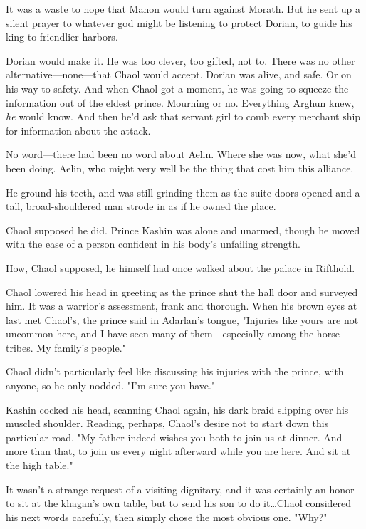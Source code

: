 It was a waste to hope that Manon would turn against Morath.
But he sent up a silent prayer to whatever god might be listening to protect Dorian, to guide his king to friendlier harbors.

Dorian would make it.
He was too clever, too gifted, not to.
There was no other alternative---none---that Chaol would accept.
Dorian was alive, and safe.
Or on his way to safety.
And when Chaol got a moment, he was going to squeeze the information out of the eldest prince.
Mourning or no.
Everything Arghun knew, \emph{he} would know.
And then he'd ask that servant girl to comb every merchant ship for information about the attack.

No word---there had been no word about Aelin.
Where she was now, what she'd been doing.
Aelin, who might very well be the thing that cost him this alliance.

He ground his teeth, and was still grinding them as the suite doors opened and a tall, broad-shouldered man strode in as if he owned the place.

Chaol supposed he did.
Prince Kashin was alone and unarmed, though he moved with the ease of a person confident in his body's unfailing strength.

How, Chaol supposed, he himself had once walked about the palace in Rifthold.

Chaol lowered his head in greeting as the prince shut the hall door and surveyed him.
It was a warrior's assessment, frank and thorough.
When his brown eyes at last met Chaol's, the prince said in Adarlan's tongue, "Injuries like yours are not uncommon here, and I have seen many of them---especially among the horse-tribes.
My family's people."

Chaol didn't particularly feel like discussing his injuries with the prince, with anyone, so he only nodded.
"I'm sure you have."

Kashin cocked his head, scanning Chaol again, his dark braid slipping over his muscled shoulder.
Reading, perhaps, Chaol's desire not to start down this particular road.
"My father indeed wishes you both to join us at dinner.
And more than that, to join us every night afterward while you are here.
And sit at the high table."

It wasn't a strange request of a visiting dignitary, and it was certainly an honor to sit at the khagan's own table, but to send his son to do it\ldots Chaol considered his next words carefully, then simply chose the most obvious one.
"Why?"

